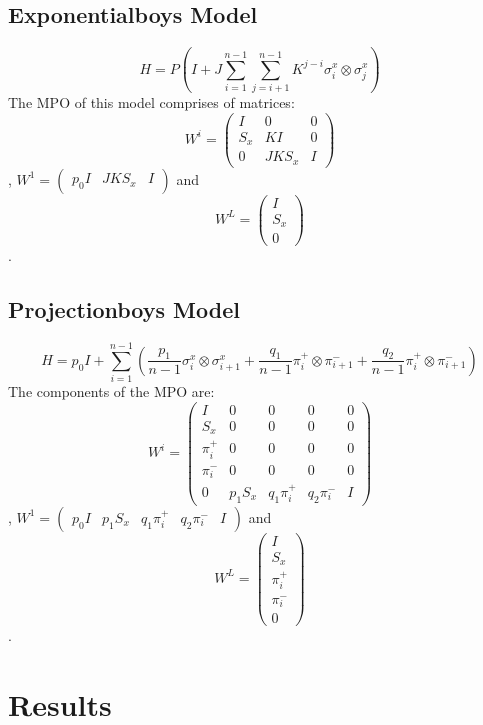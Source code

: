 \subsection{Exponentialboys Model}
\begin{displaymath}
H = P (I + J \sum_{i=1}^{n-1} \sum_{j=i+1}^{n-1} K^{j-i}\sigma_i^x\otimes\sigma_j^x)
\end{displaymath}
The MPO of this model comprises of matrices:
$$W^{i}=
\begin{pmatrix}
I & 0 & 0 \\
S_x & K I & 0 \\
0 & J K S_x & I
\end{pmatrix}
$$,
$W^1=\begin{pmatrix}p_0 I & J K S_x & I\end{pmatrix}$ and 
$$W^L=
\begin{pmatrix}
I \\ S_x \\0
\end{pmatrix}$$.


\subsection{Projectionboys Model}
\begin{displaymath}
H = p_0 I +  \sum_{i=1}^{n-1}(\frac{p_1}{n-1}\sigma_i^x\otimes\sigma_{i+1}^x + \frac{q_1}{n-1}\pi_i^+\otimes\pi_{i+1}^- + \frac{q_2}{n-1}\pi_i^+\otimes\pi_{i+1}^-)
\end{displaymath}
The components of the MPO are:
$$W^{i}=
\begin{pmatrix}
I & 0 & 0 & 0 & 0 \\
S_x & 0 & 0  & 0 & 0 \\
\pi_i^+ & 0 & 0  & 0 & 0 \\
\pi_i^- & 0 & 0  & 0 & 0 \\
0 & p_1 S_x & q_1 \pi_i^+  & q_2 \pi_i^- & I
\end{pmatrix}$$,
$W^1=\begin{pmatrix}p_0 I & p_1 S_x & q_1 \pi_i^+ & q_2 \pi_i^- & I\end{pmatrix}$ and
$$W^L=
\begin{pmatrix}
I \\ S_x \\ \pi_i^+ \\ \pi_i^- \\ 0
\end{pmatrix}$$.

\section{Results}
